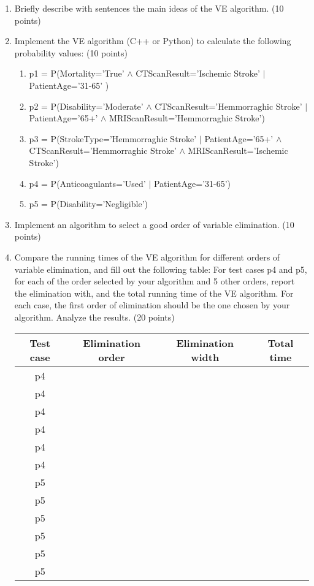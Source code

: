 \documentclass[a4paper, 11pt]{article}
\begin{document}
\begin{enumerate}
\item Briefly describe with sentences the main ideas of  the VE algorithm. (10 points)

\item Implement the VE algorithm (C++ or Python) to calculate the following probability values: (10 points)
    
\begin{enumerate}
\item p1 = P(Mortality='True' $\land$ CTScanResult='Ischemic Stroke' $|$ PatientAge='31-65' )

\item p2 = P(Disability='Moderate' $\land$ CTScanResult='Hemmorraghic Stroke' $|$ PatientAge='65+' $\land$  MRIScanResult='Hemmorraghic Stroke')

\item p3 = P(StrokeType='Hemmorraghic Stroke' $|$ PatientAge='65+' $\land$ CTScanResult='Hemmorraghic Stroke' $\land$ MRIScanResult='Ischemic Stroke')

\item p4 = P(Anticoagulants='Used' $|$ PatientAge='31-65')

\item p5 = P(Disability='Negligible')
\end{enumerate}


\item Implement an algorithm to select a good order of variable elimination. (10 points)


\item Compare the running times of the VE algorithm for different orders of variable elimination, and fill out the following table: For test cases p4 and p5, for each of the order selected by your algorithm and 5 other orders, report the elimination with, and the total running time of the VE algorithm. For each case, the first order of elimination should be the one chosen by your algorithm. Analyze the results. (20 points)
    

    \begin{tabular}{|c|c|c|c|}
\hline
Test case                                                                                             & Elimination order & Elimination width  & Total time \\ \hline
p4  & &  &            \\ \hline
p4  & &  &            \\ \hline
p4  & &  &            \\ \hline
p4  & &  &            \\ \hline
p4  & &  &            \\ \hline
p4  & &  &            \\ \hline
p5  & &  &            \\ \hline
p5  & &  &            \\ \hline
p5  & &  &            \\ \hline
p5  & &  &            \\ \hline
p5  & &  &            \\ \hline
p5  & &  &            \\ \hline
\end{tabular} 

\end{enumerate}
\end{document}
